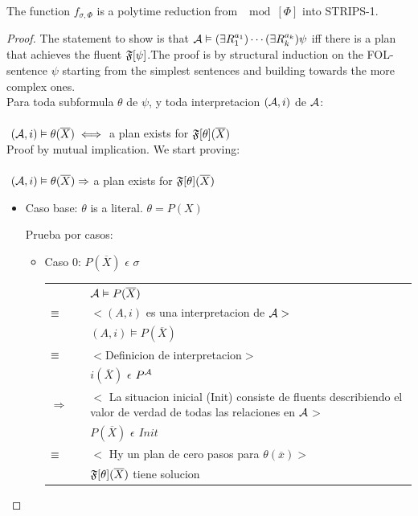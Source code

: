 \begin{theorem}
The function $f_{\sigma,\Phi}$ is a polytime reduction from $\mod[\Phi]$
into STRIPS-1.
\end{theorem}

\begin{proof}
	The statement to show is that
$\mathcal{A}\vDash(\exists R_1^{a_1})\cdots(\exists R_k^{a_k})\psi$ iff
there is a plan that achieves the fluent $\mathfrak{F}[\psi]$.The proof is by structural induction on the FOL-sentence $\psi$ starting from the simplest sentences and building 
towards the more complex ones. \\

Para toda subformula $\theta$ de $\psi$, y toda interpretacion $(\mathcal{A},i)$ de $\mathcal{A}$:\\ \\
$ $ \hspace*{3cm} $(\mathcal{A},i) \vDash \theta(\overline{X}) \iff$ a plan exists for $\mathfrak{F}[\theta](\overline{X})$ \\

Proof by mutual implication.
We start proving:\\ \\
$ $ \hspace*{3cm} $(\mathcal{A},i) \vDash \theta(\overline{X}) \Rightarrow $ a plan exists for $\mathfrak{F}[\theta](\overline{X})$ \\
\begin{itemize}
		\item Caso base: $\theta$ is a literal. $\theta = P(X)$ 
		
		Prueba por casos:
			\begin{itemize}
				\item Caso 0: $P(\overline{X})$ $\epsilon$ $\sigma$
				
				\begin{tabular}{@{}p{1mm}p{1mm}p{11cm}}	
						& & $\mathcal{A} \vDash P(\overline{X})$\\
						$\equiv$ & & $<(A,i)$ es una interpretacion de $\mathcal{A}>$ \\
						& & $(A,i) \models P(\overline{X})$ \\
						$\equiv$ & & $<$Definicion de interpretacion$>$\\
						& & $i(\overline{X})$ $\epsilon$ $P^{\mathcal{A}}$\\
						$\Rightarrow$ & & $<$ La situacion inicial (Init) consiste de fluents describiendo el valor de 
									  verdad de todas las relaciones en $\mathcal{A}$$>$\\
						& & $P(\overline{X})$ $\epsilon$ $Init$ \\
						$\equiv$ & & $<$ Hy un plan de cero pasos para $\theta(\overline{x})>$\\
						& & $\mathfrak{F}[\theta](\overline{X})$ tiene solucion
					\end{tabular}
					

\end{itemize}
\end{itemize}
\end{proof}
